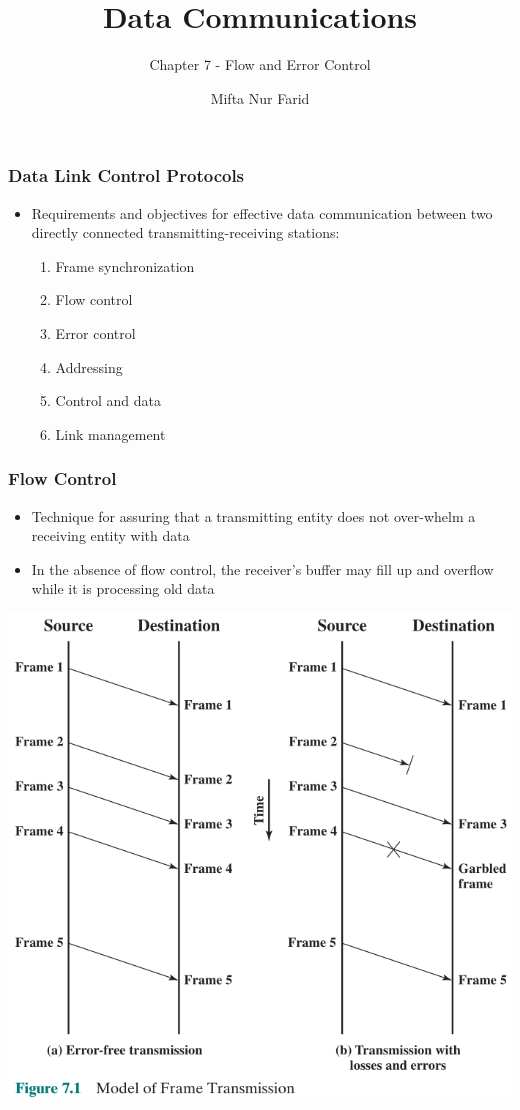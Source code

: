 \documentclass[pdflatex,compress]{beamer}
\title{Data Communications}
\subtitle{Chapter 7 - Flow and Error Control}
\author{Mifta Nur Farid}
\begin{document}
\maketitle

\begin{frame}
	\frametitle{Data Link Control Protocols}
	\begin{itemize}
		\item Requirements and objectives for effective data communication between two directly connected transmitting-receiving stations:
		\begin{enumerate}
			\item Frame synchronization
			\item Flow control
			\item Error control
			\item Addressing
			\item Control and data
			\item Link management
		\end{enumerate}
	\end{itemize}
\end{frame}

\begin{frame}
	\frametitle{Flow Control}
	\begin{itemize}
		\item Technique for assuring that a transmitting entity does not over-whelm a receiving entity with data
		\item In the absence of flow control, the receiver’s buffer may fill up and overflow while it is processing old data
	\end{itemize}
\end{frame}

\begin{frame}
	\begin{center}
		\includegraphics[width=0.6\linewidth]{img/img01}
	\end{center}
\end{frame}
\end{document}
